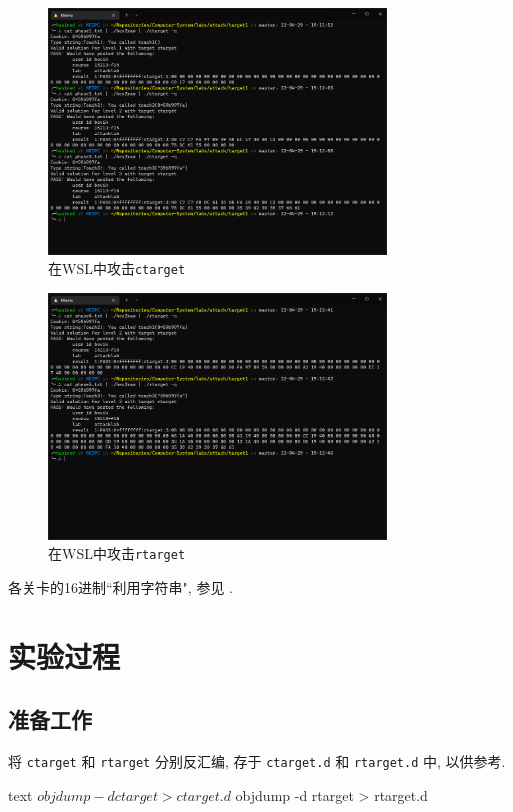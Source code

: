 \begin{figure}[H]
    \centering
    \includegraphics[width=0.8\textwidth]{ci.png}
    \caption{在WSL中攻击\texttt{ctarget}}
\end{figure}

\begin{figure}[H]
    \centering
    \includegraphics[width=0.8\textwidth]{rop.png}
    \caption{在WSL中攻击\texttt{rtarget}}
\end{figure}

各关卡的16进制“利用字符串", 参见 .

\section{实验过程}\label{procedure}

\subsection{准备工作}\label{prepare}

将 \verb|ctarget| 和 \verb|rtarget| 分别反汇编, 存于 \verb|ctarget.d| 和 \verb|rtarget.d| 中, 以供参考.
\begin{code}{text}
$ objdump -d ctarget > ctarget.d
$ objdump -d rtarget > rtarget.d
\end{code}

